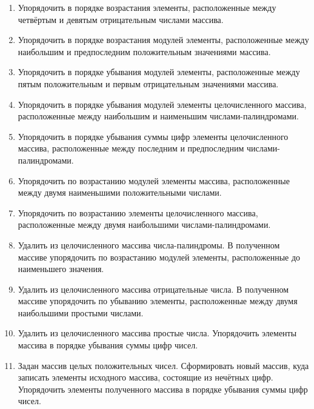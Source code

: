 \begin{enumerate}
\item Упорядочить в порядке возрастания элементы, расположенные между четвёртым и девятым отрицательным числами массива.
\item Упорядочить в порядке возрастания модулей элементы, расположенные между наибольшим и предпоследним положительным
значениями массива.
\item Упорядочить в порядке убывания модулей элементы, расположенные между пятым положительным и первым отрицательным
значениями массива.
\item Упорядочить в порядке убывания модулей элементы целочисленного массива, расположенные между наибольшим и
наименьшим числами-палиндромами.
\item Упорядочить в порядке убывания суммы цифр элементы целочисленного массива, расположенные между последним и
предпоследним числами-палиндромами.
\item Упорядочить по возрастанию модулей элементы массива, расположенные между двумя наименьшими положительными числами.
\item Упорядочить по возрастанию элементы целочисленного массива, расположенные между двумя наибольшими
числами-палиндромами.
\item Удалить из целочисленного массива числа-палиндромы. В полученном массиве упорядочить по возрастанию модулей
элементы, расположенные до наименьшего значения.
\item Удалить из целочисленного массива отрицательные числа. В полученном массиве упорядочить по убыванию элементы,
расположенные между двумя наибольшими простыми числами.
\item Удалить из целочисленного массива простые числа. Упорядочить элементы массива в порядке убывания суммы цифр чисел.
\item Задан массив целых положительных чисел. Сформировать новый массив, куда записать элементы исходного массива,
состоящие из нечётных цифр. Упорядочить элементы полученного массива в порядке убывания суммы цифр чисел.
\end{enumerate}
